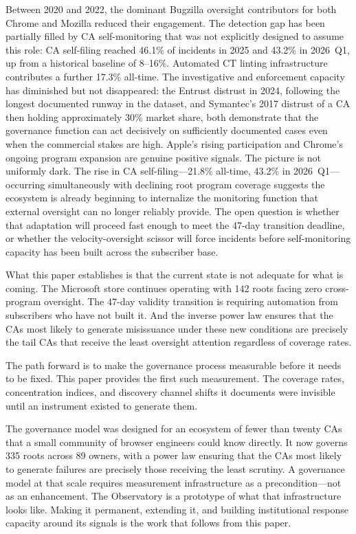 \documentclass[10pt,twocolumn,letterpaper]{article}
\begin{document}
Between 2020 and 2022, the dominant Bugzilla oversight contributors for
both Chrome and Mozilla reduced their engagement. The detection gap has
been partially filled by CA self-monitoring that was not explicitly
designed to assume this role: CA self-filing reached 46.1\% of incidents
in 2025 and 43.2\% in 2026~Q1, up from a historical baseline of 8--16\%.
Automated CT linting infrastructure contributes a further 17.3\% all-time.
The investigative and enforcement capacity has diminished but not
disappeared: the Entrust distrust in 2024, following the longest
documented runway in the dataset, and Symantec's 2017 distrust of a CA
then holding approximately 30\% market share, both demonstrate that the
governance function can act decisively on sufficiently documented cases
even when the commercial stakes are high. Apple's rising participation
and Chrome's ongoing program expansion are genuine positive signals.
The picture is not uniformly dark. The rise in CA self-filing---21.8\%
all-time, 43.2\% in 2026~Q1---occurring simultaneously with declining
root program coverage suggests the ecosystem is already beginning to
internalize the monitoring function that external oversight can no longer
reliably provide. The open question is whether that adaptation will
proceed fast enough to meet the 47-day transition deadline, or whether
the velocity-oversight scissor will force incidents before self-monitoring
capacity has been built across the subscriber base.

What this paper establishes is that the current state is not adequate
for what is coming. The Microsoft store continues operating with 142
roots facing zero cross-program oversight. The 47-day validity transition
is requiring automation from subscribers who have not built it. And the
inverse power law ensures that the CAs most likely to generate misissuance
under these new conditions are precisely the tail CAs that receive the
least oversight attention regardless of coverage rates.

The path forward is to make the governance process measurable before it
needs to be fixed. This paper provides the first such measurement. The
coverage rates, concentration indices, and discovery channel shifts it
documents were invisible until an instrument existed to generate them.

The governance model was designed for an ecosystem of fewer than twenty
CAs that a small community of browser engineers could know directly.
It now governs 335 roots across 89 owners, with a power law ensuring
that the CAs most likely to generate failures are precisely those
receiving the least scrutiny. A governance model at that scale requires
measurement infrastructure as a precondition---not as an enhancement.
The Observatory is a prototype of what that infrastructure looks like.
Making it permanent, extending it, and building institutional response
capacity around its signals is the work that follows from this paper.
\end{document}
